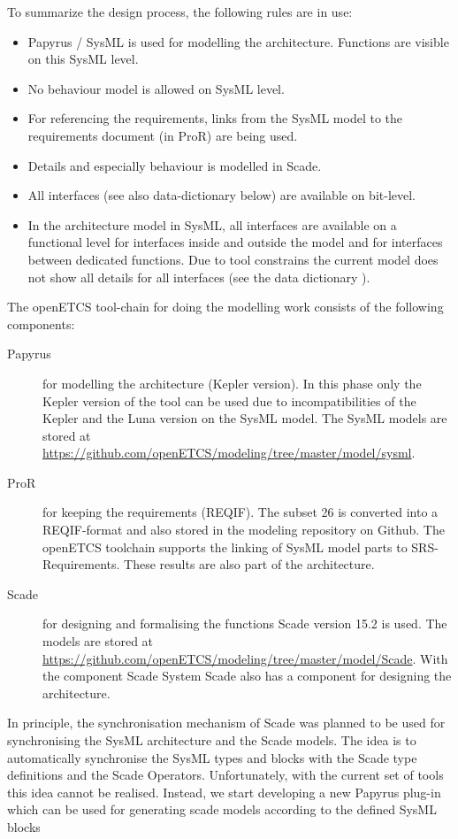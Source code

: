 \documentclass{template/openetcs_report}
\begin{document}
To summarize the design process, the following rules are in use:
\begin{itemize}
\item Papyrus / SysML is used for modelling the architecture. Functions are visible on this SysML level.
\item No behaviour model is allowed on SysML level.
\item For referencing the requirements, links from the SysML model to the requirements document (in ProR) are being used.
\item Details and especially behaviour is modelled in Scade.
\item All interfaces (see also data-dictionary below) are available on bit-level.
\item In the architecture model in SysML, all interfaces are available on a functional level for interfaces inside and outside the model and for interfaces between dedicated functions. Due to tool constrains the current model does not show all details for all interfaces (see the data dictionary \cite{dataDictionary}).
\end{itemize}

The openETCS tool-chain for doing the modelling work consists of the following components:
\begin{description}
	\item[Papyrus] for modelling the architecture (Kepler version).
	In this phase only the Kepler version of the tool can be used due to incompatibilities of the Kepler and the Luna version on the SysML model. The SysML models are stored at \url{https://github.com/openETCS/modeling/tree/master/model/sysml}.
	\item[ProR] for keeping the requirements (REQIF).
	The subset 26 is converted into a REQIF-format and also stored in the modeling repository on Github. The openETCS toolchain supports the linking of SysML model parts to SRS-Requirements. These results are also part of the architecture.
	\item[Scade] for designing and formalising the functions Scade version 15.2 is used.
	The models are stored at \url{https://github.com/openETCS/modeling/tree/master/model/Scade}.
	With the component Scade System Scade also has a component for designing the architecture.
\end{description}

In principle, the synchronisation mechanism of Scade was planned to be used for synchronising the SysML architecture and the Scade models. The idea is to automatically synchronise the SysML types and blocks with the Scade type definitions and the Scade Operators. Unfortunately, with the current set of tools this idea cannot be realised. Instead, we start developing a new Papyrus plug-in which can be used for generating scade models according to the defined SysML blocks
\end{document}
